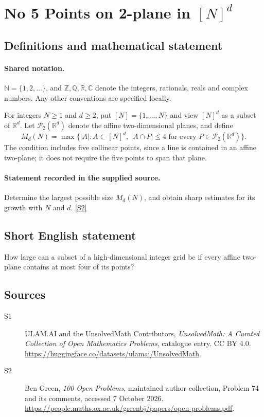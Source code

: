 \documentclass[11pt]{article}
\newcommand{\sref}[2]{\hyperlink{source:#1:#2}{[S#2]}}
\begin{document}
\section{No 5 Points on 2-plane in $[N]^d$}\label{statement}

\subsection{Definitions and mathematical statement}

\paragraph{Shared notation.}$\mathbb N=\{1,2,\ldots\}$, and $\mathbb Z,\mathbb Q,\mathbb R,\mathbb C$ denote the integers, rationals, reals and complex numbers. Any other conventions are specified locally.


For integers $N\geq1$ and $d\geq2$, put $[N]=\{1,\ldots,N\}$ and view $[N]^d$ as a subset of $\mathbb R^d$. Let $\mathcal P_2(\mathbb R^d)$ denote the affine two-dimensional planes, and define
\[
 M_d(N)=\max\bigl\{|A|:A\subset[N]^d,\ |A\cap P|\leq4\text{ for every }P\in\mathcal P_2(\mathbb R^d)\bigr\}.
\]
The condition includes five collinear points, since a line is contained in an affine two-plane; it does not require the five points to span that plane.
\paragraph{Statement recorded in the supplied source.}
Determine the largest possible size $M_d(N)$, and obtain sharp estimates for its growth with $N$ and $d$. \sref{statement}{2}
\subsection{Short English statement}
How large can a subset of a high-dimensional integer grid be if every affine two-plane contains at most four of its points?
\subsection{Sources}
\begin{description}
\item[\hypertarget{source:statement:1}{S1}] ULAM.AI and the UnsolvedMath Contributors, \emph{UnsolvedMath: A Curated Collection of Open Mathematics Problems}, catalogue entry. CC BY 4.0. \url{https://huggingface.co/datasets/ulamai/UnsolvedMath}.
\item[\hypertarget{source:statement:2}{S2}] Ben Green, \emph{100 Open Problems}, maintained author collection, Problem 74 and its comments, accessed 7 October 2026. \url{https://people.maths.ox.ac.uk/greenbj/papers/open-problems.pdf}.
\end{description}
\label{end:statement}
\end{document}
